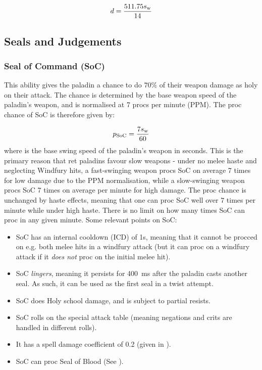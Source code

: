 \documentclass[letterpaper,11pt]{article}
\begin{document}
	\begin{equation}
		d = \frac{511.75 s_\mathrm{w} }{14}
	\end{equation}
	
	\subsection{Seals and Judgements}
		
	\subsubsection{Seal of Command (SoC)}
	This ability gives the paladin a chance to do $70\%$ of their weapon damage as holy on their attack.
	The chance is determined by the base weapon speed of the paladin's weapon, and is normalised at 7 procs per minute (PPM).
	The proc chance of SoC is therefore given by:
	
	\begin{equation}
		p_\mathrm{SoC}   = \frac{7 s_\mathrm{w} }{60}
	\end{equation}
	where \ws is the base swing speed of the paladin's weapon in seconds.
	This is the primary reason that ret paladins favour slow weapons - under no melee haste and neglecting Windfury hits, a fast-swinging weapon procs SoC on average 7 times for low damage due to the PPM normalisation, while a slow-swinging weapon procs SoC 7 times on average per minute for high damage.
	The proc chance is unchanged by haste effects, meaning that one can proc SoC well over 7 times per minute while under high haste.
	There is no limit on how many times SoC can proc in any given minute.
	Some relevant points on SoC:
	
	\begin{itemize}
		\item SoC has an internal cooldown (ICD) of 1s, meaning that it cannot be procced on e.g. both melee hits in a windfury attack (but it can proc on a windfury attack if it \emph{does not} proc on the initial melee hit).
		\item SoC \emph{lingers}, meaning it persists for 400~ms after the paladin casts another seal. As such, it can be used as the first seal in a twist attempt.
		\item SoC does Holy school damage, and is subject to partial resists.
		\item SoC rolls on the special attack table (meaning negations and crits are handled in different rolls).
		\item It has a spell damage coefficient of 0.2 (given in ).		
		\item SoC can proc Seal of Blood (See ).		
	\end{itemize}
	
\end{document}
